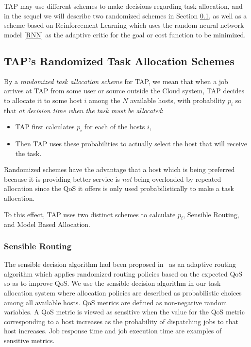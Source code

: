 \documentclass[journal]{IEEEtran}
\begin{document}
TAP may use different schemes to make decisions regarding task allocation, and in the sequel we will describe two randomized schemes in Section \ref{random}, as well as a scheme based on Reinforcement Learning \cite{Sutton} which uses the random neural network model \ref{RNN} as the adaptive critic for the goal or cost function to be minimized.


\subsection{TAP's Randomized Task Allocation Schemes} \label{random}

By a {\em randomized task allocation scheme} for TAP, we mean that when a job arrives at TAP from some user or source outside the Cloud system, TAP decides to allocate it to some host $i$ among the $N$
available hosts, with probability $p_i$ so
that {\em at decision time when the task must be allocated}:
\begin{itemize}
\item TAP first calculates $p_i$ for each of the hosts $i$,
\item Then TAP uses these probabilities to actually select the host that will receive the task.
\end{itemize}
Randomized schemes have the advantage that a host which is being preferred because it is providing better service is {\em not} being overloaded by repeated allocation since the QoS it offers is
only used probabilistically to make a task allocation.

To this effect, TAP uses two distinct schemes to calculate $p_i$, Sensible Routing, and Model Based Allocation.
\subsubsection{Sensible Routing}
The sensible decision algorithm had been proposed in~\cite{gelenbe2003sensible} as an adaptive routing algorithm which applies randomized routing policies based on the expected QoS so as to improve QoS. We use the sensible decision algorithm in our task allocation system where allocation policies are described as probabilistic choices among all available hosts. QoS metrics are defined as non-negative random variables. A QoS metric is viewed as sensitive when the value for the QoS metric corresponding to a host increases as the probability of dispatching jobs to that host increases. Job response time and job execution time are examples of sensitive metrics.
 
\end{document}
